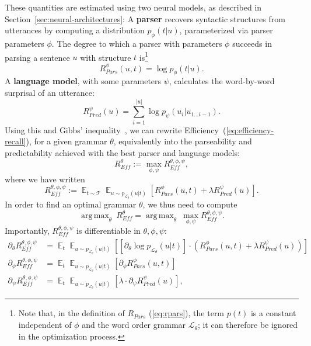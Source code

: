 \documentclass[10pt,twoside,lineno]{article}
\DeclareMathOperator*{\argmax}{arg\,max}
\DeclareMathOperator{\E}{\mathop{\mathbb{E}}}
\newcommand{\key}[1]{\textbf{#1}}
\begin{document}
These quantities are estimated using two neural models, as described in Section~\ref{sec:neural-architectures}:
A \key{parser} recovers syntactic structures from utterances by computing a distribution $p_\phi(t|u)$, parameterized via parser parameters $\phi$.
The degree to which a parser with parameters $\phi$ succeeds in parsing a sentence $u$ with structure $t$ is\footnote{Note that, in the definition of $R_{Pars}$ (\ref{eq:rpars}), the term $p(t)$ is a constant independent of $\phi$ and the word order grammar $\mathcal{L}_\theta$; it can therefore be ignored in the optimization process.} 
\begin{equation}
	R_{Pars}^{\phi}(u,t) =  \log p_\phi(t|u).
\end{equation}
A \key{language model}, with some parameters $\psi$, calculates the word-by-word surprisal of an utterance:
\begin{equation}
	R_{Pred}^{\psi}(u) = \sum_{i=1}^{|u|} \log p_\psi(u_i|u_{1\dots i-1}).
\end{equation}
Using this and Gibbs' inequality~\cite{cover2006elements}, we can rewrite Efficiency~(\ref{eq:efficiency-recall}), for a given grammar $\theta$, equivalently into the parseability and predictability achieved with the best parser and language models:
\begin{equation}
	R_{\textit{Eff}}^{\theta} := \max_{\phi,\psi} R_{\textit{Eff}}^{\theta, \phi, \psi},
\end{equation}\label{eq:efficiency-rewrite}
where we have written
\begin{equation}
R_{\textit{Eff}}^{\theta, \phi, \psi} := \E_{t \sim \mathcal{T}} \E_{u \sim p_{\mathcal{L}_\theta}(u|t)} \left[R_{Pars}^{\phi}(u,t) + \lambda R_{Pred}^{\psi}(u)\right].
\end{equation}
In order to find an optimal grammar $\theta$, we thus need to compute 
\begin{equation}\label{eq:efficiency}
\argmax_\theta\	R_{\textit{Eff}}^{\theta} = \argmax_\theta\	\max_{\phi, \psi} R_{\textit{Eff}}^{\theta, \phi, \psi}.
\end{equation}
Importantly, $R_{\textit{Eff}}^{\theta, \phi, \psi}$ is differentiable in $\theta, \phi, \psi$: %
\begin{align}
\partial_\theta R_{\textit{Eff}}^{\theta, \phi, \psi} &= \E_t \E_{u \sim p_{\mathcal{L}_\theta}(u|t)} \left[  \left[\partial_\theta \log p_{\mathcal{L}_\theta}(u|t)\right] \cdot    \left(R_{Pars}^{\phi}(u,t) + \lambda R_{Pred}^{\psi}(u)\right) \right] \label{eq:dtheta}\\ 
\partial_\phi R_{\textit{Eff}}^{\theta, \phi, \psi} &= \E_t \E_{u \sim p_{\mathcal{L}_\theta}(u|t)}  \left[\partial_\phi R_{Pars}^{\phi}(u,t)\right] \\
\partial_\psi R_{\textit{Eff}}^{\theta, \phi, \psi} &= \E_t \E_{u \sim p_{\mathcal{L}_\theta}(u|t)}  \left[\lambda \cdot \partial_\psi R_{Pred}^{\psi}(u)\right] \label{eq:dpsi},
\end{align}
\end{document}
